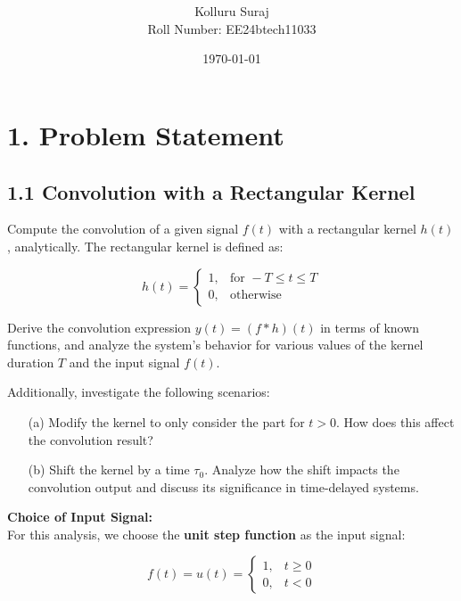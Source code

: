 \documentclass[12pt,a4paper,titlepage]{article}
\title{\textbf{ }}
\author{
    Kolluru Suraj \\
    Roll Number: EE24btech11033
}
\date{\today}
\begin{document}
\maketitle

\section*{1. Problem Statement}

\subsection*{1.1 Convolution with a Rectangular Kernel}
Compute the convolution of a given signal \( f(t) \) with a rectangular kernel \( h(t) \), analytically. The rectangular kernel is defined as:

\begin{equation}
h(t) = 
\begin{cases} 
1, & \text{for } -T \leq t \leq T \\
0, & \text{otherwise}
\end{cases}
\end{equation}

Derive the convolution expression \( y(t) = (f * h)(t) \) in terms of known functions, and analyze the system's behavior for various values of the kernel duration \( T \) and the input signal \( f(t) \).

Additionally, investigate the following scenarios:

\begin{enumerate}
    \item[(a)] Modify the kernel to only consider the part for \( t > 0 \). How does this affect the convolution result?
    \item[(b)] Shift the kernel by a time \( \tau_0 \). Analyze how the shift impacts the convolution output and discuss its significance in time-delayed systems.
\end{enumerate}

\textbf{Choice of Input Signal:}\\
For this analysis, we choose the \textbf{unit step function} as the input signal:

\begin{equation}
f(t) = u(t) = 
\begin{cases} 
1, & t \geq 0 \\
0, & t < 0 
\end{cases}
\end{equation}
\end{document}
